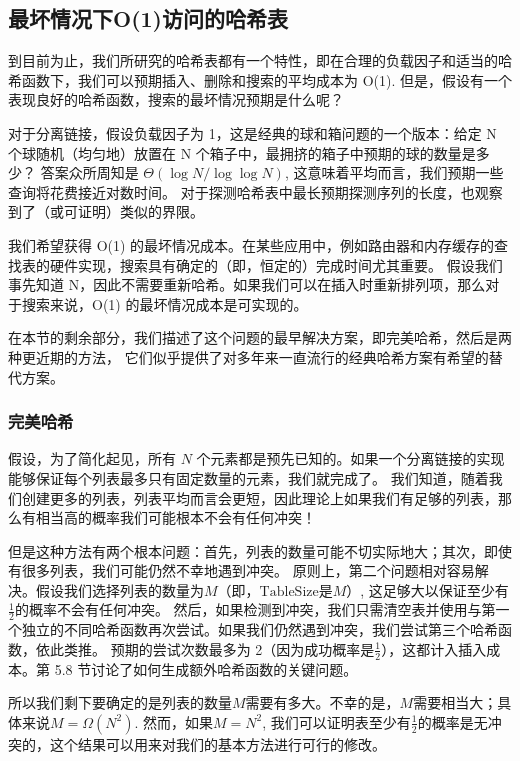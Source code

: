 \documentclass[a4paper]{ctexart}
\theoremstyle{definition}
\theoremstyle{definition}
\begin{document}
\subsection{最坏情况下O(1)访问的哈希表}

到目前为止，我们所研究的哈希表都有一个特性，即在合理的负载因子和适当的哈希函数下，我们可以预期插入、删除和搜索的平均成本为 O(1). 
但是，假设有一个表现良好的哈希函数，搜索的最坏情况预期是什么呢？

对于分离链接，假设负载因子为 1，这是经典的球和箱问题的一个版本：给定 N 个球随机（均匀地）放置在 N 个箱子中，最拥挤的箱子中预期的球的数量是多少？
答案众所周知是 $\Theta(\log N / \log \log N)$, 这意味着平均而言，我们预期一些查询将花费接近对数时间。
对于探测哈希表中最长预期探测序列的长度，也观察到了（或可证明）类似的界限。

我们希望获得 O(1) 的最坏情况成本。在某些应用中，例如路由器和内存缓存的查找表的硬件实现，搜索具有确定的（即，恒定的）完成时间尤其重要。
假设我们事先知道 N，因此不需要重新哈希。如果我们可以在插入时重新排列项，那么对于搜索来说，O(1) 的最坏情况成本是可实现的。

在本节的剩余部分，我们描述了这个问题的最早解决方案，即完美哈希，然后是两种更近期的方法，
它们似乎提供了对多年来一直流行的经典哈希方案有希望的替代方案。

\subsubsection{完美哈希}

假设，为了简化起见，所有 \( N \) 个元素都是预先已知的。如果一个分离链接的实现能够保证每个列表最多只有固定数量的元素，我们就完成了。
我们知道，随着我们创建更多的列表，列表平均而言会更短，因此理论上如果我们有足够的列表，那么有相当高的概率我们可能根本不会有任何冲突！

但是这种方法有两个根本问题：首先，列表的数量可能不切实际地大；其次，即使有很多列表，我们可能仍然不幸地遇到冲突。
原则上，第二个问题相对容易解决。假设我们选择列表的数量为\( M \)（即，\( \text{TableSize} \)是\( M \)）, 这足够大以保证至少有\( \frac{1}{2} \)的概率不会有任何冲突。
然后，如果检测到冲突，我们只需清空表并使用与第一个独立的不同哈希函数再次尝试。如果我们仍然遇到冲突，我们尝试第三个哈希函数，依此类推。
预期的尝试次数最多为 2（因为成功概率是\( \frac{1}{2} \)），这都计入插入成本。第 5.8 节讨论了如何生成额外哈希函数的关键问题。

所以我们剩下要确定的是列表的数量\( M \)需要有多大。不幸的是，\( M \)需要相当大；具体来说\( M = \Omega(N^2) \). 
然而，如果\( M = N^2 \), 我们可以证明表至少有\( \frac{1}{2} \)的概率是无冲突的，这个结果可以用来对我们的基本方法进行可行的修改。
\end{document}
